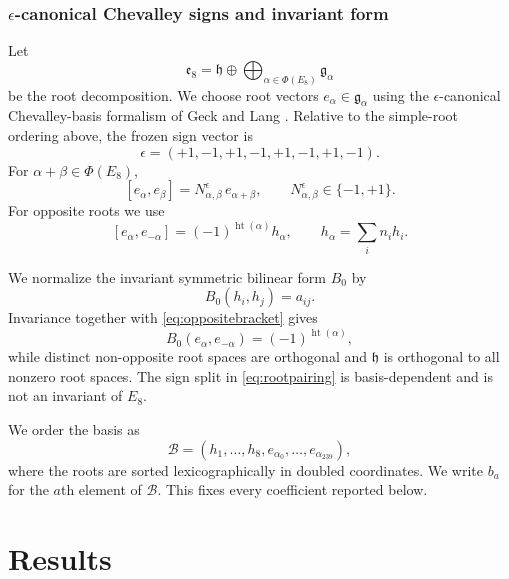 \documentclass[11pt]{article}
\theoremstyle{definition}
\theoremstyle{remark}
\newcommand{\e}{\mathfrak e}
\newcommand{\h}{\mathfrak h}
\newcommand{\PhiE}{\Phi(E_8)}
\begin{document}
\subsubsection{\texorpdfstring{$\epsilon$-canonical}{epsilon-canonical} Chevalley signs and invariant form}

Let
\[
\e_8=\h\oplus\bigoplus_{\alpha\in\PhiE}\mathfrak g_\alpha
\]
be the root decomposition.  We choose root vectors $e_\alpha\in\mathfrak g_\alpha$ using the $\epsilon$-canonical Chevalley-basis formalism of Geck and Lang \cite{GeckLang2025}.  Relative to the simple-root ordering above, the frozen sign vector is
\begin{equation}\label{eq:epsilon}
\epsilon=(+1,-1,+1,-1,+1,-1,+1,-1).
\end{equation}
For $\alpha+\beta\in\PhiE$,
\[
[e_\alpha,e_\beta]=N_{\alpha,\beta}^{\epsilon}\,e_{\alpha+\beta},
\qquad N_{\alpha,\beta}^{\epsilon}\in\{-1,+1\}.
\]
For opposite roots we use
\begin{equation}\label{eq:oppositebracket}
[e_\alpha,e_{-\alpha}]
=(-1)^{\operatorname{ht}(\alpha)}h_\alpha,
\qquad
h_\alpha=\sum_i n_i h_i.
\end{equation}

We normalize the invariant symmetric bilinear form $B_0$ by
\begin{equation}\label{eq:B0cartan}
B_0(h_i,h_j)=a_{ij}.
\end{equation}
Invariance together with \eqref{eq:oppositebracket} gives
\begin{equation}\label{eq:rootpairing}
B_0(e_\alpha,e_{-\alpha})=(-1)^{\operatorname{ht}(\alpha)},
\end{equation}
while distinct non-opposite root spaces are orthogonal and $\h$ is orthogonal to all nonzero root spaces.  The sign split in \eqref{eq:rootpairing} is basis-dependent and is not an invariant of $E_8$.

We order the basis as
\begin{equation}\label{eq:basisorder}
\mathcal B=(h_1,\ldots,h_8,e_{\alpha_0},\ldots,e_{\alpha_{239}}),
\end{equation}
where the roots are sorted lexicographically in doubled coordinates.  We write $b_a$ for the $a$th element of $\mathcal B$.  This fixes every coefficient reported below.

\section{Results}\label{sec:results}
\end{document}
